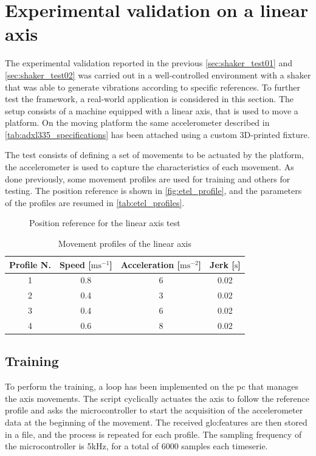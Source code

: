 \clearpage
\section{Experimental validation on a linear axis}
\label{sec:ExperimentalValidation}

The experimental validation reported in the previous \autoref{sec:shaker_test01} and \autoref{sec:shaker_test02} was carried out in a well-controlled environment with a shaker that was able to generate vibrations according to specific references. To further test the framework, a real-world application is considered in this section. The setup consists of a machine equipped with a linear axis, that is used to move a platform. On the moving platform the same accelerometer described in \autoref{tab:adxl335_specifications} has been attached using a custom 3D-printed fixture.

The test consists of defining a set of movements to be actuated by the platform, the accelerometer is used to capture the characteristics of each movement. As done previously, some movement profiles are used for training and others for testing. The position reference is shown in \autoref{fig:etel_profile}, and the parameters of the profiles are resumed in \autoref{tab:etel_profiles}.

\begin{figure}
    \centering
    \todo%
    \caption{Position reference for the linear axis test}
    \label{fig:etel_profile}
\end{figure}

\begin{table}
    \centering
    \caption{Movement profiles of the linear axis}
    \label{tab:etel_profiles}
    \begin{tabular}{cccc} 
    \toprule
    \textbf{Profile N.} & \textbf{Speed} {[}$\text{m}\text{s}^{-1}$] & \textbf{Acceleration} {[}$\text{m}\text{s}^{-2}$] & \textbf{Jerk} {[}$\text{s}$] \\ 
    \hline
    1 & 0.8 & 6 & 0.02 \\
    2 & 0.4 & 3 & 0.02 \\
    3 & 0.4 & 6 & 0.02 \\
    4 & 0.6 & 8 & 0.02 \\
    \bottomrule
\end{tabular}
\end{table}

\subsection{Training}
To perform the training, a loop has been implemented on the \gls{pc} that manages the axis movements. The script cyclically actuates the axis to follow the reference profile and asks the microcontroller to start the acquisition of the accelerometer data at the beginning of the movement. The received \gls{glo:feature}s are then stored in a file, and the process is repeated for each profile. The sampling frequency of the microcontroller is 5kHz, for a total of 6000 samples each timeserie. 

